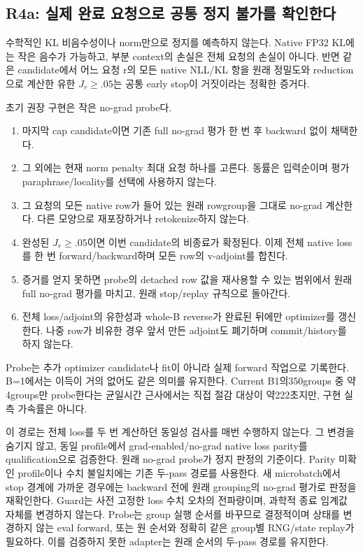 \documentclass[11pt]{article}
\begin{document}
\subsection{R4a: 실제 완료 요청으로 공통 정지 불가를 확인한다}
수학적인 KL 비음수성이나 norm만으로 정지를 예측하지 않는다. Native FP32 KL에는
작은 음수가 가능하고, 부분 context의 손실은 전체 요청의 손실이 아니다.
반면 같은 candidate에서 어느 요청 r의 모든 native NLL/KL 항을 원래 정밀도와
reduction으로 계산한 유한 $J_r\ge.05$는 공통 early stop이 거짓이라는 정확한 증거다.

초기 권장 구현은 작은 no-grad probe다.
\begin{enumerate}
\item 마지막 cap candidate이면 기존 full no-grad 평가 한 번 후 backward 없이 채택한다.
\item 그 외에는 현재 norm penalty 최대 요청 하나를 고른다. 동률은 입력순이며 평가
paraphrase/locality를 선택에 사용하지 않는다.
\item 그 요청의 모든 native row가 들어 있는 원래 rowgroup을 그대로 no-grad 계산한다.
다른 모양으로 재포장하거나 retokenize하지 않는다.
\item 완성된 $J_r\ge.05$이면 이번 candidate의 비종료가 확정된다. 이제 전체 native loss를
한 번 forward/backward하며 모든 row의 v-adjoint를 합친다.
\item 증거를 얻지 못하면 probe의 detached row 값을 재사용할 수 있는 범위에서 원래
full no-grad 평가를 마치고, 원래 stop/replay 규칙으로 돌아간다.
\item 전체 loss/adjoint의 유한성과 whole-B reverse가 완료된 뒤에만 optimizer를 갱신한다.
나중 row가 비유한 경우 앞서 만든 adjoint도 폐기하며 commit/history를 하지 않는다.
\end{enumerate}
Probe는 추가 optimizer candidate나 fit이 아니라 실제 forward 작업으로 기록한다.
B=1에서는 이득이 거의 없어도 같은 의미를 유지한다. Current B1의350groups 중 약4groups만
probe한다는 균일시간 근사에서는 직접 절감 대상이 약222초지만, 구현 실측 가속률은 아니다.

이 경로는 전체 loss를 두 번 계산하던 동일성 검사를 매번 수행하지 않는다.
그 변경을 숨기지 않고, 동일 profile에서 grad-enabled/no-grad native loss parity를
qualification으로 검증한다. 원래 no-grad probe가 정지 판정의 기준이다.
Parity 미확인 profile이나 수치 불일치에는 기존 두-pass 경로를 사용한다.
새 microbatch에서 stop 경계에 가까운 경우에는 backward 전에 원래 grouping의
no-grad 평가로 판정을 재확인한다. Guard는 사전 고정한 loss 수치 오차의 전파량이며,
과학적 종료 임계값 자체를 변경하지 않는다.
Probe는 group 실행 순서를 바꾸므로 결정적이며 상태를 변경하지 않는 eval forward,
또는 원 순서와 정확히 같은 group별 RNG/state replay가 필요하다.
이를 검증하지 못한 adapter는 원래 순서의 두-pass 경로를 유지한다.
\end{document}
